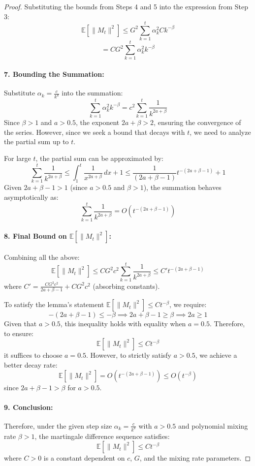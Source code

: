 \begin{proof}
Substituting the bounds from Steps 4 and 5 into the expression from Step 3:
\[
\mathbb{E}[\|M_t\|^2] \leq G^2 \sum_{k=1}^t \alpha_k^2 C k^{-\beta}
\]
\[
= C G^2 \sum_{k=1}^t \alpha_k^2 k^{-\beta}
\]

\paragraph{7. Bounding the Summation:}

Substitute \( \alpha_k = \frac{c}{k^a} \) into the summation:
\[
\sum_{k=1}^t \alpha_k^2 k^{-\beta} = c^2 \sum_{k=1}^t \frac{1}{k^{2a + \beta}}
\]
Since \( \beta > 1 \) and \( a > 0.5 \), the exponent \( 2a + \beta > 2 \), ensuring the convergence of the series. However, since we seek a bound that decays with \( t \), we need to analyze the partial sum up to \( t \).

For large \( t \), the partial sum can be approximated by:
\[
\sum_{k=1}^t \frac{1}{k^{2a + \beta}} \leq \int_{1}^{t} \frac{1}{x^{2a + \beta}} \, dx + 1 \leq \frac{1}{(2a + \beta - 1)} t^{-(2a + \beta - 1)} + 1
\]
Given \( 2a + \beta - 1 > 1 \) (since \( a > 0.5 \) and \( \beta > 1 \)), the summation behaves asymptotically as:
\[
\sum_{k=1}^t \frac{1}{k^{2a + \beta}} = O\left(t^{-(2a + \beta - 1)}\right)
\]

\paragraph{8. Final Bound on \( \mathbb{E}[\|M_t\|^2] \):}

Combining all the above:
\[
\mathbb{E}[\|M_t\|^2] \leq C G^2 c^2 \sum_{k=1}^t \frac{1}{k^{2a + \beta}} \leq C' t^{-(2a + \beta - 1)}
\]
where \( C' = \frac{C G^2 c^2}{2a + \beta - 1} + C G^2 c^2 \) (absorbing constants).

To satisfy the lemma's statement \( \mathbb{E}[\|M_t\|^2] \leq C t^{-\beta} \), we require:
\[
-(2a + \beta - 1) \leq -\beta \implies 2a + \beta - 1 \geq \beta \implies 2a \geq 1
\]
Given that \( a > 0.5 \), this inequality holds with equality when \( a = 0.5 \). Therefore, to ensure:
\[
\mathbb{E}[\|M_t\|^2] \leq C t^{-\beta}
\]
it suffices to choose \( a = 0.5 \). However, to strictly satisfy \( a > 0.5 \), we achieve a better decay rate:
\[
\mathbb{E}[\|M_t\|^2] = O\left(t^{-(2a + \beta - 1)}\right) \leq O\left(t^{-\beta}\right)
\]
since \( 2a + \beta - 1 > \beta \) for \( a > 0.5 \).

\paragraph{9. Conclusion:}

Therefore, under the given step size \( \alpha_k = \frac{c}{k^a} \) with \( a > 0.5 \) and polynomial mixing rate \( \beta > 1 \), the martingale difference sequence satisfies:
\[
\mathbb{E}[\|M_t\|^2] \leq C t^{-\beta}
\]
where \( C > 0 \) is a constant dependent on \( c \), \( G \), and the mixing rate parameters.

\end{proof}